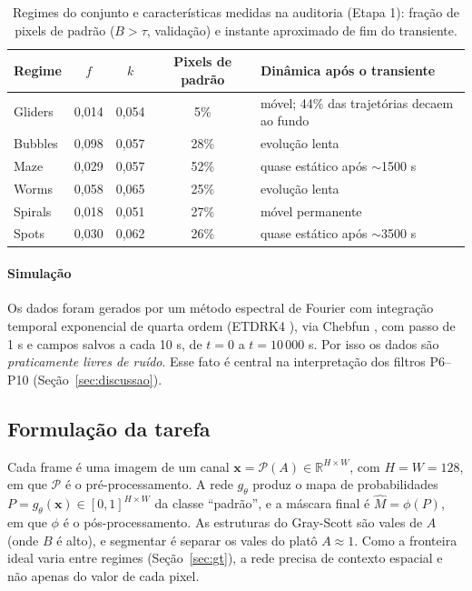 \begin{table}[t]\centering\small
\caption{Regimes do conjunto e características medidas na auditoria (Etapa 1): fração de pixels de
padrão ($B>\tau$, validação) e instante aproximado de fim do transiente.}
\label{tab:regimes_fk}
\begin{tabular}{lcccl}
\toprule
Regime & $f$ & $k$ & Pixels de padrão & Dinâmica após o transiente \\
\midrule
Gliders & 0,014 & 0,054 & 5\%  & móvel; 44\% das trajetórias decaem ao fundo \\
Bubbles & 0,098 & 0,057 & 28\% & evolução lenta \\
Maze    & 0,029 & 0,057 & 52\% & quase estático após $\sim$1500 s \\
Worms   & 0,058 & 0,065 & 25\% & evolução lenta \\
Spirals & 0,018 & 0,051 & 27\% & móvel permanente \\
Spots   & 0,030 & 0,062 & 26\% & quase estático após $\sim$3500 s \\
\bottomrule
\end{tabular}
\end{table}

\paragraph{Simulação} Os dados foram gerados por um método espectral de Fourier com integração
temporal exponencial de quarta ordem (ETDRK4 \cite{kassam2005}), via Chebfun \cite{chebfun2014},
com passo de 1 s e campos salvos a cada 10 s, de $t=0$ a $t=10\,000$ s. Por isso os dados são
\emph{praticamente livres de ruído}. Esse fato é central na interpretação dos filtros P6--P10
(Seção~\ref{sec:discussao}).

\subsection{Formulação da tarefa}
\label{sec:tarefa}
Cada frame é uma imagem de um canal $\mathbf{x} = \mathcal{P}(A)\in\mathbb{R}^{H\times W}$, com
$H=W=128$, em que $\mathcal{P}$ é o pré-processamento. A rede $g_\theta$ produz o mapa de
probabilidades $P = g_\theta(\mathbf{x})\in[0,1]^{H\times W}$ da classe ``padrão'', e a máscara
final é $\hat{M} = \phi(P)$, em que $\phi$ é o pós-processamento. As estruturas do Gray-Scott são
vales de $A$ (onde $B$ é alto), e segmentar é separar os vales do platô $A\approx1$. Como a
fronteira ideal varia entre regimes (Seção~\ref{sec:gt}), a rede precisa de contexto espacial e
não apenas do valor de cada pixel.

